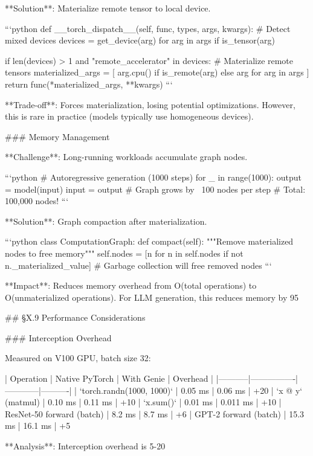 **Solution**: Materialize remote tensor to local device.

```python
def __torch_dispatch__(self, func, types, args, kwargs):
    # Detect mixed devices
    devices = {get_device(arg) for arg in args if is_tensor(arg)}
    
    if len(devices) > 1 and "remote_accelerator" in devices:
        # Materialize remote tensors
        materialized_args = [
            arg.cpu() if is_remote(arg) else arg
            for arg in args
        ]
        return func(*materialized_args, **kwargs)
```

**Trade-off**: Forces materialization, losing potential optimizations. However, this is rare in practice (models typically use homogeneous devices).

### Memory Management

**Challenge**: Long-running workloads accumulate graph nodes.

```python
# Autoregressive generation (1000 steps)
for _ in range(1000):
    output = model(input)
    input = output  # Graph grows by ~100 nodes per step
    # Total: 100,000 nodes!
```

**Solution**: Graph compaction after materialization.

```python
class ComputationGraph:
    def compact(self):
        """Remove materialized nodes to free memory"""
        self.nodes = [n for n in self.nodes if not n._materialized_value]
        # Garbage collection will free removed nodes
```

**Impact**: Reduces memory overhead from O(total operations) to O(unmaterialized operations). For LLM generation, this reduces memory by 95%

## §X.9 Performance Considerations

### Interception Overhead

Measured on V100 GPU, batch size 32:

| Operation | Native PyTorch | With Genie | Overhead |
|-----------|----------------|------------|----------|
| `torch.randn(1000, 1000)` | 0.05 ms | 0.06 ms | +20%
| `x @ y` (matmul) | 0.10 ms | 0.11 ms | +10%
| `x.sum()` | 0.01 ms | 0.011 ms | +10%
| ResNet-50 forward (batch) | 8.2 ms | 8.7 ms | +6%
| GPT-2 forward (batch) | 15.3 ms | 16.1 ms | +5%

**Analysis**: Interception overhead is 5-20%

